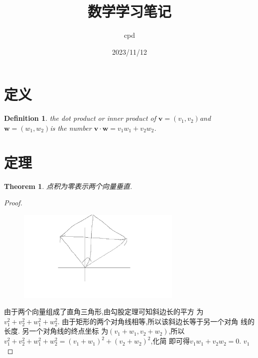\documentclass[UTF-8]{ctexart}
\newtheorem{definition}{Definition}[section]
\newtheorem{theorem}{Theorem}[section]
\newtheorem{proof}{Proof}[section]
\begin{document}
\title {数学学习笔记} \author{cpd} \date{2023/11/12}
\maketitle

\tableofcontents
\newpage

\section{定义}

\begin{definition}
  the dot product or inner product of $\mathbf{v}
=(v_1,v_2)$and$\mathbf{w}=(w_1,w_2)$is the number $\mathbf{v} \cdot \mathbf{w} = v_1w_1+v_2w_2$.

\end{definition}
\section{定理}

\begin{theorem}
  点积为零表示两个向量垂直.

\end{theorem}
\begin{proof}
  \begin{figure}[H] %
    \centering %
    \includegraphics[width=0.7\textwidth]{images/math/1.jpg} %
  \end{figure}
  由于两个向量组成了直角三角形,由勾股定理可知斜边长的平方
  为$v_1^2+v_2^2+w_1^2+w_2^2$. 由于矩形的两个对角线相等,所以该斜边长等于另一个对角
  线的长度. 另一个对角线的终点坐标
  为$(v_1+w_1,v_2+w_2)$,所以$v_1^2+v_2^2+w_1^2+w_2^2=(v_1+w_1)^2+(v_2+w_2)^2$,化简
  即可得$v_1w_1+v_2w_2=0$. $v_1$	
\end{proof}
\end{document}
